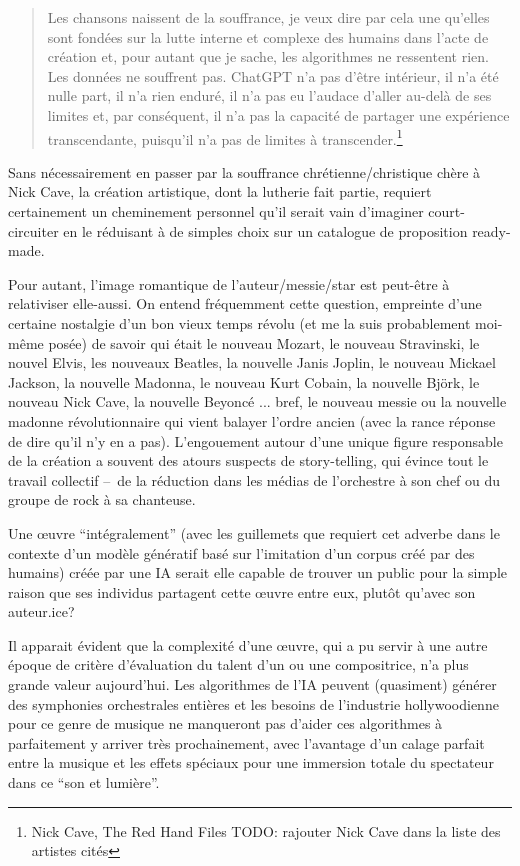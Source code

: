 \begin{quotation}
Les chansons naissent de la souffrance, je veux dire par cela une qu'elles sont fondées sur la lutte interne et complexe des humains dans l'acte de création et, pour autant que je sache, les algorithmes ne ressentent rien. Les données ne souffrent pas. ChatGPT n'a pas d'être intérieur, il n'a été nulle part, il n'a rien enduré, il n'a pas eu l'audace d'aller au-delà de ses limites et, par conséquent, il n'a pas la capacité de partager une expérience transcendante, puisqu'il n'a pas de limites à transcender.\footnote{Nick Cave, The Red Hand Files TODO: rajouter Nick Cave dans la liste des artistes cités}
\end{quotation}

Sans nécessairement en passer par la souffrance chrétienne/christique chère à Nick Cave, la création artistique, dont la lutherie fait partie, requiert certainement un cheminement personnel qu'il serait vain d'imaginer court-circuiter en le réduisant à de simples choix sur un catalogue de proposition ready-made.

Pour autant, l'image romantique de l'auteur/messie/star est peut-être à relativiser elle-aussi. 
On entend fréquemment cette question, empreinte d'une certaine nostalgie d'un bon vieux temps révolu (et me la suis probablement moi-même posée) de savoir qui était le nouveau Mozart, le nouveau Stravinski, le nouvel Elvis, les nouveaux Beatles, la nouvelle Janis Joplin, le nouveau Mickael Jackson, la nouvelle Madonna, le nouveau Kurt Cobain, la nouvelle Björk, le nouveau Nick Cave, la nouvelle Beyoncé ... bref, le nouveau messie ou la nouvelle madonne révolutionnaire qui vient balayer l'ordre ancien (avec la rance réponse de dire qu'il n'y en a pas). 
L'engouement autour d'une unique figure responsable de la création a souvent des atours suspects de story-telling, qui évince tout le travail collectif --~de la réduction dans les médias de l'orchestre à son chef ou du groupe de rock à sa chanteuse.

Une œuvre ``intégralement'' (avec les guillemets que requiert cet adverbe dans le contexte d'un modèle génératif basé sur l'imitation d'un corpus créé par des humains) créée par une IA serait elle capable de trouver un public pour la simple raison que ses individus partagent cette œuvre entre eux, plutôt qu'avec son auteur.ice?


Il apparait évident que la complexité d'une œuvre, qui a pu servir à une autre époque de critère d'évaluation du talent d'un ou une compositrice, n'a plus grande valeur aujourd'hui. Les algorithmes de l'IA peuvent (quasiment) générer des symphonies orchestrales entières et les besoins de l'industrie hollywoodienne pour ce genre de musique ne manqueront pas d'aider ces algorithmes à parfaitement y arriver très prochainement, avec l'avantage d'un calage parfait entre la musique et les effets spéciaux pour une immersion totale du spectateur dans ce ``son et lumière''.

